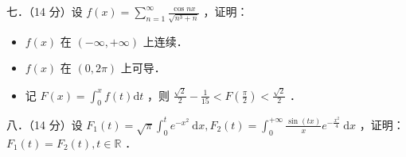 \documentclass{article}
\begin{document}
七．（14 分）设 \(f(x)=\sum_{n=1}^{\infty} \frac{\cos n x}{\sqrt{n^{3}+n}}\) ，证明：

\begin{itemize}
  \item[（1）] \(f(x)\) 在 \((-\infty,+\infty)\) 上连续．
  \item[（2）] \(f(x)\) 在 \((0,2 \pi)\) 上可导．
  \item[（3）] 记 \(F(x)=\int_{0}^{x} f(t) \mathrm{d} t\) ，则 \(\frac{\sqrt{2}}{2}-\frac{1}{15}<F\left(\frac{\pi}{2}\right)<\frac{\sqrt{2}}{2}\) ．
\end{itemize}

八．（14 分）设 \(F_{1}(t)=\sqrt{\pi} \int_{0}^{t} e^{-x^{2}} \mathrm{~d} x, F_{2}(t)=\int_{0}^{+\infty} \frac{\sin (t x)}{x} e^{-\frac{x^{2}}{4}} \mathrm{~d} x\) ，证明：\(F_{1}(t)=F_{2}(t), t \in \mathbb{R}\) ．
\end{document}
